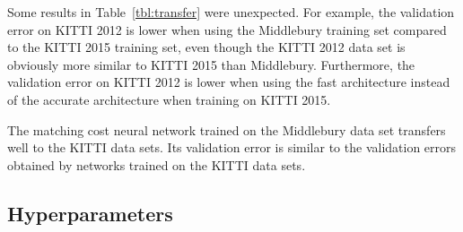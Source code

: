 \documentclass[twoside,11pt]{article}
\begin{document}
Some results in Table~\ref{tbl:transfer} were unexpected. For example,
the validation error on KITTI 2012 is lower when using the Middlebury training
set compared to the KITTI 2015 training set, even though the KITTI 2012 data
set is obviously more similar to KITTI 2015 than Middlebury. Furthermore, the
validation error on KITTI 2012 is lower when using the fast architecture
instead of the accurate architecture when training on KITTI 2015.

The matching cost neural network trained on the Middlebury data set transfers
well to the KITTI data sets. Its validation error is similar to the validation
errors obtained by networks trained on the KITTI data sets.


\subsection{Hyperparameters}
\end{document}

